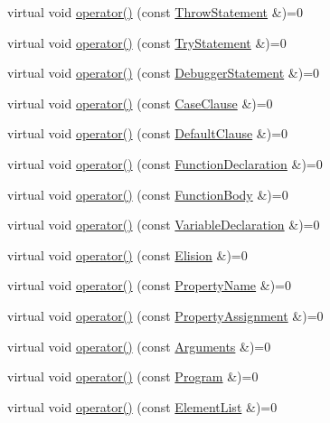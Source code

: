 \begin{DoxyCompactItemize}
\item 
virtual void \hyperlink{struct_visitor_a806a67e34e7866e3af078b3c2b421a24}{operator()} (const \hyperlink{struct_throw_statement}{Throw\+Statement} \&)=0
\item 
virtual void \hyperlink{struct_visitor_af65bd8aa26745dea293f06d553d4f46f}{operator()} (const \hyperlink{struct_try_statement}{Try\+Statement} \&)=0
\item 
virtual void \hyperlink{struct_visitor_a7e091bee5a2d416aef22f9b1abd8c7ee}{operator()} (const \hyperlink{struct_debugger_statement}{Debugger\+Statement} \&)=0
\item 
virtual void \hyperlink{struct_visitor_acf85f394ddde782f9c08103055716d53}{operator()} (const \hyperlink{struct_case_clause}{Case\+Clause} \&)=0
\item 
virtual void \hyperlink{struct_visitor_adf82a6bdb4aad978d8ac6a3878a0d400}{operator()} (const \hyperlink{struct_default_clause}{Default\+Clause} \&)=0
\item 
virtual void \hyperlink{struct_visitor_aa4450ebee6fecf69499279c0768282f1}{operator()} (const \hyperlink{struct_function_declaration}{Function\+Declaration} \&)=0
\item 
virtual void \hyperlink{struct_visitor_a72bb7e5f0b3bd7ebc8e30f5903a5c5f2}{operator()} (const \hyperlink{struct_function_body}{Function\+Body} \&)=0
\item 
virtual void \hyperlink{struct_visitor_a31c2d34895501d90193ec523c8acde05}{operator()} (const \hyperlink{struct_variable_declaration}{Variable\+Declaration} \&)=0
\item 
virtual void \hyperlink{struct_visitor_a87450ddc80e1522e8ef06cc7c168bad4}{operator()} (const \hyperlink{struct_elision}{Elision} \&)=0
\item 
virtual void \hyperlink{struct_visitor_a51d8b1d3dafa5d6a7d878673a2c4f9a8}{operator()} (const \hyperlink{struct_property_name}{Property\+Name} \&)=0
\item 
virtual void \hyperlink{struct_visitor_a698c9aa4b47188061f156fe58c148d55}{operator()} (const \hyperlink{struct_property_assignment}{Property\+Assignment} \&)=0
\item 
virtual void \hyperlink{struct_visitor_a73daac2b555cca03beaf9da73bf540c7}{operator()} (const \hyperlink{struct_arguments}{Arguments} \&)=0
\item 
virtual void \hyperlink{struct_visitor_a768e64f6e6fffb7440e3c1f1a78d9481}{operator()} (const \hyperlink{struct_program}{Program} \&)=0
\item 
virtual void \hyperlink{struct_visitor_a339d238c4c4b3c356878817481b398be}{operator()} (const \hyperlink{struct_element_list}{Element\+List} \&)=0

\end{DoxyCompactItemize}
